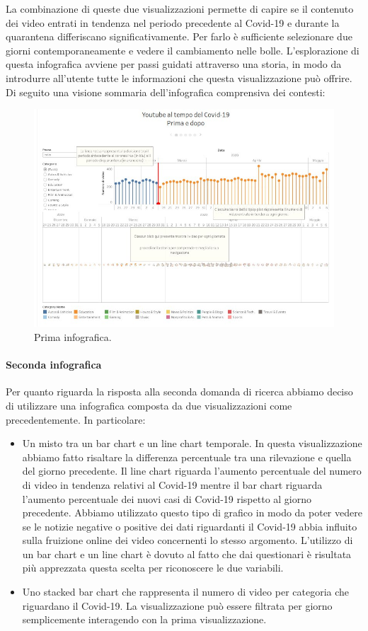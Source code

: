\documentclass[10pt, a4paper,openany]{article}
\begin{document}
La combinazione di queste due visualizzazioni permette di capire se il contenuto dei video entrati in tendenza nel periodo precedente al Covid-19 e  durante la quarantena differiscano significativamente. Per farlo è sufficiente selezionare due giorni contemporaneamente e vedere il cambiamento nelle bolle. L'esplorazione di questa infografica avviene per passi guidati attraverso una storia, in modo da introdurre all'utente tutte le informazioni che questa visualizzazione può offrire. Di seguito una visione sommaria dell'infografica comprensiva dei contesti:
\begin{figure}[H]
	\centering
	\includegraphics[height=0.5 \linewidth]{pics/prima_infografica.png}
	\caption{Prima infografica.}
\end{figure}

\paragraph{Seconda infografica} Per quanto riguarda la risposta alla seconda domanda di ricerca abbiamo deciso di utilizzare una infografica composta da due visualizzazioni come precedentemente. In particolare:
\begin{itemize}
	\item Un misto tra un bar chart e un line chart temporale. In questa visualizzazione abbiamo fatto risaltare la differenza percentuale tra una rilevazione e quella del giorno precedente. Il line chart riguarda l'aumento percentuale del numero di video in tendenza relativi al Covid-19 mentre il bar chart riguarda l'aumento percentuale dei nuovi casi di Covid-19 rispetto al giorno precedente. 
	Abbiamo utilizzato questo tipo di grafico in modo da poter vedere se le notizie negative o positive dei dati riguardanti il Covid-19 abbia influito sulla fruizione online dei video concernenti lo stesso argomento.
	L'utilizzo di un bar chart e un line chart è dovuto al fatto che dai questionari è risultata più apprezzata questa scelta per riconoscere le due variabili.

	\item Uno stacked bar chart che rappresenta il numero di video per categoria che riguardano il Covid-19. La visualizzazione può essere filtrata per giorno semplicemente interagendo con la prima visualizzazione.
\end{itemize}
\end{document}
